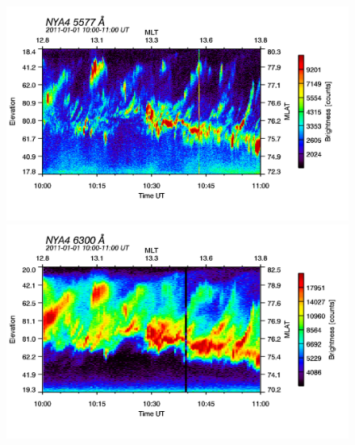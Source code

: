 \begin{figure}
\begin{minipage}{0.49\textwidth}
\includegraphics[width=1\linewidth]{Figures/Allsky/5577/nya4_20110101_1000_1100_5577_cal.png}
\end{minipage}
\begin{minipage}{0.49\textwidth}
\includegraphics[width=1\linewidth]{Figures/Allsky/6300/nya4_20110101_1000_1100_6300_cal.png}
\end{minipage}
\end{figure}





